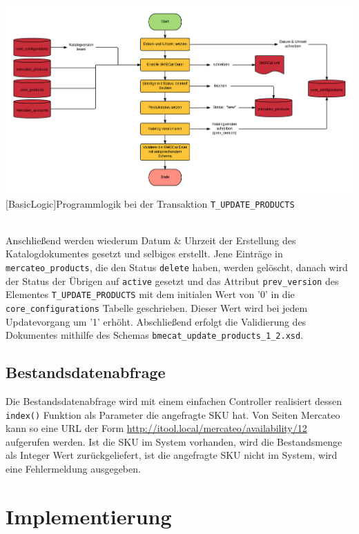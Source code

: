 	\begin{minipage}{\linewidth}
		\vspace{1em}
		\centering
		\includegraphics[width=1 \linewidth]{img/updateCatalogComplete}
		[BasicLogic]{Programmlogik  bei der Transaktion \texttt{T\_UPDATE\_PRODUCTS}}
		\vspace{1em}
	\end{minipage}\\
	
	
	Anschließend werden wiederum Datum \& Uhrzeit der Erstellung des Katalogdokumentes gesetzt und selbiges erstellt. Jene Einträge in \texttt{mercateo\_products}, die den Status \texttt{delete} haben, werden gelöscht, danach wird der Status der Übrigen auf \texttt{active} gesetzt und das Attribut \texttt{prev\_version} des Elementes \texttt{T\_UPDATE\_PRODUCTS} mit dem initialen Wert von '0' in die \texttt{core\_configurations} Tabelle geschrieben. Dieser Wert wird bei jedem Updatevorgang um '1' erhöht.	Abschließend erfolgt die Validierung des Dokumentes mithilfe des Schemas \texttt{bmecat\_update\_products\_1\_2.xsd}.
	
	\subsection{Bestandsdatenabfrage}
	
	Die Bestandsdatenabfrage wird mit einem einfachen Controller realisiert dessen \texttt{index()} Funktion als Parameter die angefragte SKU hat.
	Von Seiten Mercateo kann so eine URL der Form \url{http://itool.local/mercateo/availability/12} aufgerufen werden. Ist die SKU im System vorhanden, wird die Bestandsmenge als Integer Wert zurückgeliefert, ist die angefragte SKU nicht im System, wird eine Fehlermeldung ausgegeben.
	
	\section{Implementierung}
	
